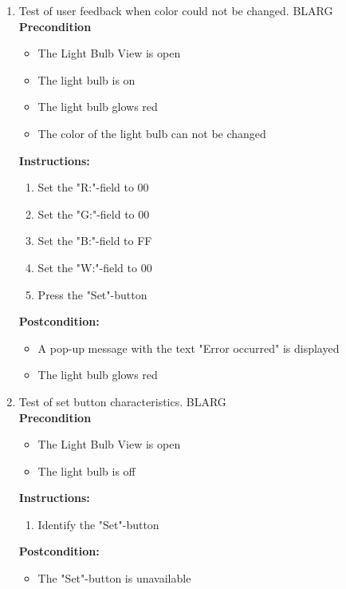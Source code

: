 \documentclass[a4paper]{article}
\newlength{\testlabellength}
\newenvironment{testlist}{\begin{enumerate}[label=\bfseries Instruction \thesubsection.\arabic* , labelindent=0pt, labelwidth=\testlabellength , leftmargin=2cm]}{\end{enumerate}}
\newenvironment{precondition}{
{\color{white}BLARG}\\ 
\textbf{Precondition}
\begin{itemize}[labelindent=0cm, labelwidth=2cm , leftmargin=1cm]
}
{\end{itemize}}
\newenvironment{instruction}{
\textbf{Instructions:}
\begin{enumerate}[label=\bfseries  \arabic*., labelindent=0cm, labelwidth=2cm , leftmargin=1cm]
}
{\end{enumerate}}
\newenvironment{postcondition}{
\textbf{Postcondition:}
\begin{itemize}[labelindent=0cm, labelwidth=2cm , leftmargin=1cm]
}
{\end{itemize}}
\begin{document}
\begin{appendices}
\begin{testlist}
	\item Test of user feedback when color could not be changed.
		\begin{precondition}
			\item The Light Bulb View is open
			\item The light bulb is on
			\item The light bulb glows red
			\item The color of the light bulb can not be changed
		\end{precondition}
		\begin{instruction}
			\item Set the "R:"-field to 00
			\item Set the "G:"-field to 00
			\item Set the "B:"-field to FF
			\item Set the "W:"-field to 00
			\item Press the "Set"-button
		\end{instruction}
		\begin{postcondition}
			\item A pop-up message with the text "Error occurred" is displayed
			\item The light bulb glows red
		\end{postcondition}
\newpage
	\item Test of set button characteristics.
		\begin{precondition}
			\item The Light Bulb View is open
			\item The light bulb is off
		\end{precondition}
		
		\begin{instruction}
			\item Identify the "Set"-button
		\end{instruction}

		\begin{postcondition}
			\item The "Set"-button is unavailable
		\end{postcondition}


\end{testlist}
\end{appendices}
\end{document}
